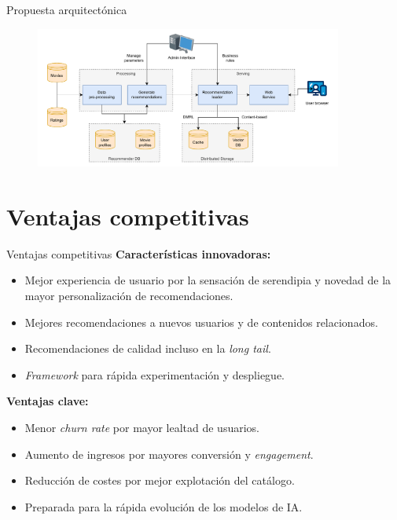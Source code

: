 \documentclass{beamer}
\begin{document}
\begin{frame}{Propuesta arquitectónica}
    \begin{figure}
    \centering
        \includegraphics[width=0.9\textwidth]{images/tfm-arch.drawio.pdf}
    \end{figure}
\end{frame}

\section{Ventajas competitivas}
\begin{frame}{Ventajas competitivas}
    \textbf{Características innovadoras:}
    \begin{itemize}
        \item Mejor experiencia de usuario por la sensación de serendipia y novedad de la mayor personalización de recomendaciones.
        \item Mejores recomendaciones a nuevos usuarios y de contenidos relacionados.
        \item Recomendaciones de calidad incluso en la \textit{long tail}.
        \item \textit{Framework} para rápida experimentación y despliegue.
    \end{itemize}
    \textbf{Ventajas clave:}
    \begin{itemize}
        \item Menor \textit{churn rate} por mayor lealtad de usuarios.
        \item Aumento de ingresos por mayores conversión y \textit{engagement}.
        \item Reducción de costes por mejor explotación del catálogo.
        \item Preparada para la rápida evolución de los modelos de IA.
    \end{itemize}
\end{frame}

\end{document}
